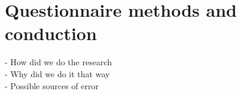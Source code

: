 \section{Questionnaire methods and conduction}
- How did we do the research\\
- Why did we do it that way\\
- Possible sources of error